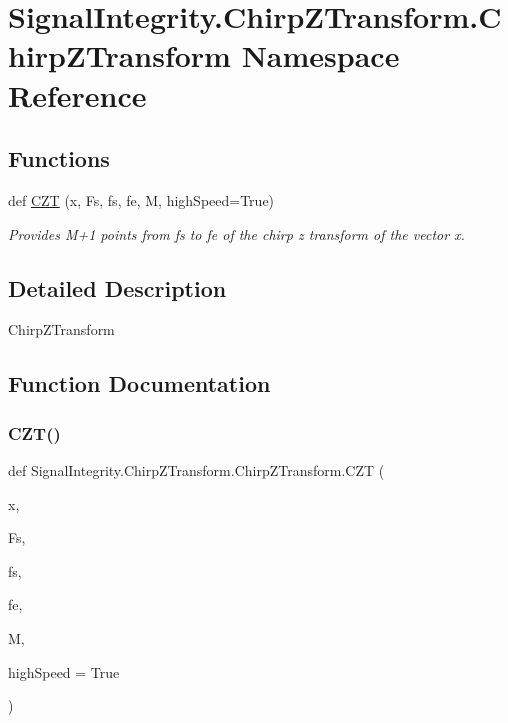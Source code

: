 \hypertarget{namespaceSignalIntegrity_1_1ChirpZTransform_1_1ChirpZTransform}{}\section{Signal\+Integrity.\+Chirp\+Z\+Transform.\+Chirp\+Z\+Transform Namespace Reference}
\label{namespaceSignalIntegrity_1_1ChirpZTransform_1_1ChirpZTransform}
\subsection*{Functions}
\begin{DoxyCompactItemize}
\item 
def \hyperlink{namespaceSignalIntegrity_1_1ChirpZTransform_1_1ChirpZTransform_a0198512a0c89499890c4375cfe968473}{C\+ZT} (x, Fs, fs, fe, M, high\+Speed=True)
\begin{DoxyCompactList}\small\item\em Provides M+1 points from fs to fe of the chirp z transform of the vector x. \end{DoxyCompactList}\end{DoxyCompactItemize}


\subsection{Detailed Description}
\begin{DoxyVerb}ChirpZTransform\end{DoxyVerb}
 

\subsection{Function Documentation}
\mbox{\label{namespaceSignalIntegrity_1_1ChirpZTransform_1_1ChirpZTransform_a0198512a0c89499890c4375cfe968473}} 
\subsubsection{\texorpdfstring{C\+Z\+T()}{CZT()}}
{\footnotesize\ttfamily def Signal\+Integrity.\+Chirp\+Z\+Transform.\+Chirp\+Z\+Transform.\+C\+ZT (\begin{DoxyParamCaption}\item[{}]{x,  }\item[{}]{Fs,  }\item[{}]{fs,  }\item[{}]{fe,  }\item[{}]{M,  }\item[{}]{high\+Speed = {\ttfamily True} }\end{DoxyParamCaption})}



